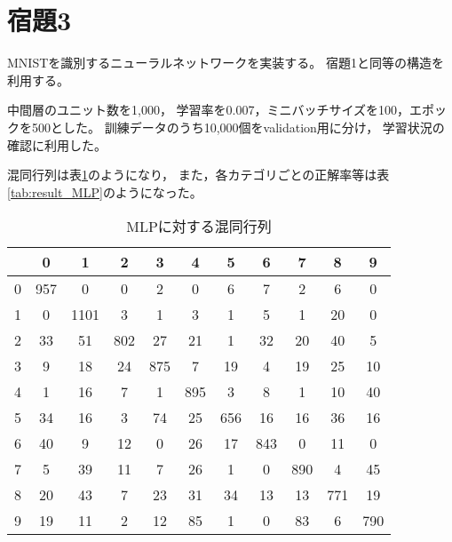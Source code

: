 \documentclass[class=jsarticle, crop=false, dvipdfmx, fleqn]{standalone}
\begin{document}
\section*{宿題3}

MNISTを識別するニューラルネットワークを実装する。
宿題1と同等の構造を利用する。

中間層のユニット数を1,000，
学習率を0.007，ミニバッチサイズを100，エポックを500とした。
訓練データのうち10,000個をvalidation用に分け，
学習状況の確認に利用した。

混同行列は表\ref{tab:confusion_matrix_MLP}のようになり，
また，各カテゴリごとの正解率等は表\ref{tab:result_MLP}のようになった。

\begin{table}[H]
	\centering
	\caption{MLPに対する混同行列}
	\begin{tabular}{|c||cccccccccc|} \hline
			& 0 & 1 & 2 & 3 & 4 & 5 & 6 & 7 & 8 & 9 \\ \hline\hline
        0     & 957 & 0 & 0 & 2 & 0 & 6 & 7 & 2 & 6 & 0 \\
        1     & 0 & 1101 & 3 & 1 & 3 & 1 & 5 & 1 & 20 & 0 \\
        2     & 33 & 51 & 802 & 27 & 21 & 1 & 32 & 20 & 40 & 5 \\
        3     & 9 & 18 & 24 & 875 & 7 & 19 & 4 & 19 & 25 & 10 \\
        4     & 1 & 16 & 7 & 1 & 895 & 3 & 8 & 1 & 10 & 40 \\
        5     & 34 & 16 & 3 & 74 & 25 & 656 & 16 & 16 & 36 & 16 \\
        6     & 40 & 9 & 12 & 0 & 26 & 17 & 843 & 0 & 11 & 0 \\
        7     & 5 & 39 & 11 & 7 & 26 & 1 & 0 & 890 & 4 & 45 \\
        8     & 20 & 43 & 7 & 23 & 31 & 34 & 13 & 13 & 771 & 19 \\
        9     & 19 & 11 & 2 & 12 & 85 & 1 & 0 & 83 & 6 & 790 \\
		\hline
	\end{tabular}
	\label{tab:confusion_matrix_MLP}
\end{table}
\end{document}
